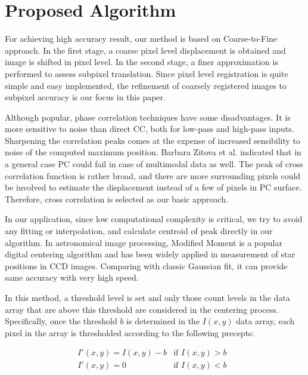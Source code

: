 \documentclass[conference]{IEEEtran}
\begin{document}
\section{Proposed Algorithm}
For achieving high accuracy result, our method is based on Coarse-to-Fine approach\cite{cit:17}. In the first stage, a coarse pixel level displacement is obtained and image is shifted in pixel level. In the second stage, a finer approximation is performed to assess subpixel translation. Since pixel level registration is quite simple and easy implemented, the refinement of coarsely registered images to subpixel accuracy is our focus in this paper.

Although popular, phase correlation techniques have some disadvantages. It is more sensitive to noise than direct CC, both for low-pass and high-pass inputs. Sharpening the correlation peaks comes at the expense of increased sensibility to noise of the computed maximum position\cite{cit:3}. Barbara Zitova et al.\cite{cit:1} indicated that in a general case PC could fail in case of multimodal data as well. The peak of cross correlation function is rather broad, and there are more surrounding pixels could be involved to estimate the displacement instead of a few of pixels in PC surface. Therefore, cross correlation is selected as our basic approach.

In our application, since low computational complexity is critical, we try to avoid any fitting or interpolation, and calculate centroid of peak directly in our algorithm. In astronomical image processing, Modified Moment is a popular digital centering algorithm\cite{cit:18} and has been widely applied in measurement of star positions in CCD images. Comparing with classic Gaussian fit, it can provide same accuracy with very high speed.

In this method, a threshold level is set and only those count levels in the data array that are above this threshold are considered in the centering process. Specifically, once the threshold $b$ is determined in the $I(x,y)$ data array, each pixel in the array is thresholded according to the following precepts:

\begin{equation}
 \begin{array}{ll}
     I'(x,y)=I(x,y)-b & \textrm{if $I(x,y)> b$ }\\
     I'(x,y)=0 & \textrm{if $I(x,y)<b$ }
    \end{array}
 \label{eq:eq1}
\end{equation}
\end{document}
